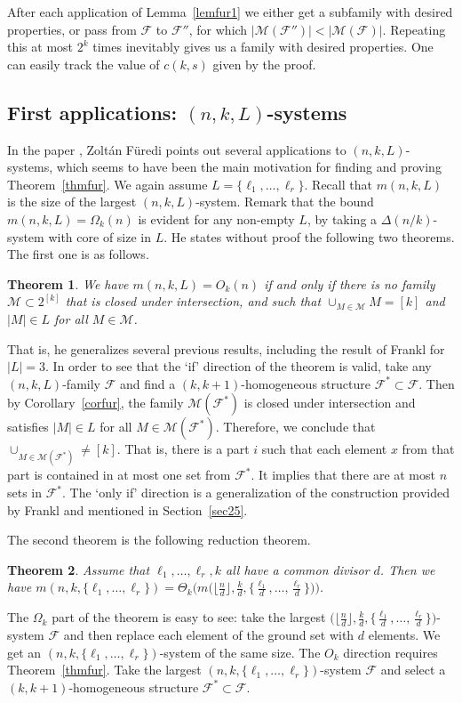 \documentclass[graybox]{svmult}
\newcommand{\ff}{\mathcal{F}}
\newcommand{\m}{\mathcal}
\newtheorem{thm}{Theorem}
\begin{document}
After each application of Lemma~\ref{lemfur1} we either get a subfamily with desired properties, or pass from $\ff$ to $\ff''$, for which $|\m M(\ff'')|<|\m M(\ff)|$.  Repeating this at most $2^{k}$ times inevitably gives us a family with desired properties. One can easily track the value of $c(k,s)$ given by the proof.

\subsection{First applications: $(n,k,L)$-systems} In the paper \cite{Fu1}, Zolt\'an F\"uredi points out several applications to $(n,k,L)$-systems, which seems to have been the main motivation for finding and proving Theorem~\ref{thmfur}. We again assume $L = \{\ell_1,\ldots, \ell_r\}$. Recall that $m(n,k,L)$ is the size of the largest $(n,k,L)$-system. Remark that the bound $m(n,k,L) = \Omega_k(n)$ is evident for any non-empty $L$, by taking a $\Delta(n/k)$-system with core of size in $L$. He states without proof the following two theorems. The first one is as follows.
\begin{thm}\label{thmfur1}
  We have $m(n,k,L) = O_k(n)$ if and only if there is no family $\m M\subset 2^{[k]}$ that is closed under intersection, and such that $\cup_{M\in \m M} M = [k]$ and $|M|\in L$ for all $M\in \m M$.
\end{thm}
That is, he generalizes several previous results, including the result of Frankl \cite{Fra83} for $|L|=3$.  In order to see that the `if' direction of the theorem is valid, take any $(n,k,L)$-family $\ff$ and find a $(k,k+1)$-homogeneous structure $\ff^*\subset \ff$. Then by Corollary~\ref{corfur}, the family $\m M(\ff^*)$ is closed under intersection and satisfies $|M|\in L$ for all $M\in \m M(\ff^*)$. Therefore, we conclude that $\cup_{M\in \m M(\ff^*)} \ne [k]$. That is, there is a part $i$ such that each element $x$ from that part is contained in at most one set from $\ff^*$. It implies that there are at most $n$ sets in $\ff^*$. The `only if' direction is a generalization of the construction provided by Frankl \cite{Fra83} and mentioned in Section~\ref{sec25}.

The second theorem is the following reduction theorem.

\begin{thm}\label{thmfur2}
  Assume that $\ell_1,\ldots, \ell_r,k$ all have a common divisor $d$. Then we have $m(n,k,\{\ell_1,\ldots, \ell_r\}) = \Theta_k\big(m\big(\lfloor\frac nd\rfloor,\frac kd,\{\frac{\ell_1}d,\ldots, \frac{\ell_r}d\}\big)\big)$.
\end{thm}
The $\Omega_k$ part of the theorem is easy to see: take the largest $\big(\lfloor\frac nd\rfloor,\frac kd,\{\frac{\ell_1}d,\ldots, \frac{\ell_r}d\}\big)$-system $\ff$ and then replace each element of the ground set with $d$ elements. We get an $(n,k,\{\ell_1,\ldots, \ell_r\})$-system of the same size. The $O_k$ direction requires Theorem~\ref{thmfur}. Take the largest $(n,k,\{\ell_1,\ldots, \ell_r\})$-system $\ff$ and select a  $(k,k+1)$-homogeneous structure $\ff^*\subset \ff$.
\end{document}
